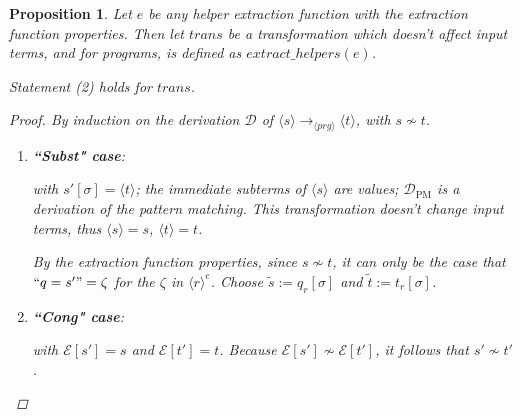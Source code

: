 \documentclass[11pt]{article} %
\newtheorem{proposition}{Proposition}
\begin{document}
\begin{proposition}

Let $e$ be any helper extraction function with the extraction function properties. Then let $trans$ be a transformation which doesn't affect input terms, and for programs, is defined as $extract\_helpers(e)$.

Statement (2) holds for $trans$.

\begin{proof} By induction on the derivation $\mathcal{D}$ of $\langle s \rangle \longrightarrow_{\langle prg \rangle} \langle t \rangle$, with $s \not\sim t$.

\begin{enumerate}
\item \textbf{``Subst" case}:

\begin{prooftree}
\end{prooftree}

with $s'[\sigma] = \langle t \rangle$; the immediate subterms of $\langle s \rangle$ are values; $\mathcal{D}_{\textrm{PM}}$ is a derivation of the pattern matching. This transformation doesn't change input terms, thus $\langle s \rangle = s$, $\langle t \rangle = t$.

By the extraction function properties, since $s \not\sim t$, it can only be the case that $`` q = s' " = \zeta$ for the $\zeta$ in $\langle r \rangle^e$. Choose $\widetilde{s} := q_r[\sigma]$ and $\widetilde{t} := t_r[\sigma]$.

\item \textbf{``Cong" case}:

\begin{prooftree}
\end{prooftree}

with $\mathcal{E}[s'] = s$ and $\mathcal{E}[t'] = t$. Because $\mathcal{E}[s'] \not\sim \mathcal{E}[t']$, it follows that $s' \not\sim t'$.


\end{enumerate}
\end{proof}
\end{proposition}
\end{document}
